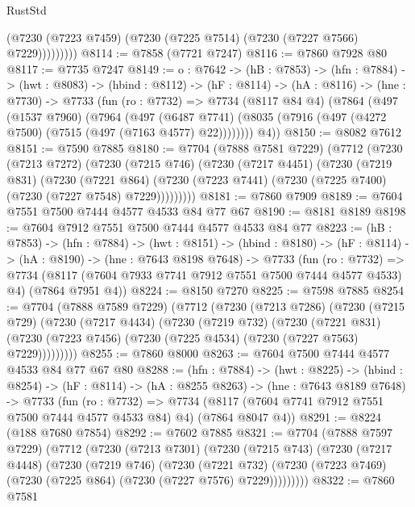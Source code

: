 \begin{lexlean}{RustStd}
\begin{coremodule}
                (@7230 (@7223 @7459) (@7230 (@7225 @7514) (@7230 (@7227 @7566) @7229)))))))))
@8114 := @7858 (@7721 @7247)
@8116 := @7860 @7928 @80
@8117 := @7735 @7247
@8149 := {o : @7642} ->
  (hB : @7853) ->
  (hfn : @7884) ->
  (hwt : @8083) ->
  (hbind : @8112) ->
  (hF : @8114) ->
  (hA : @8116) ->
  (hne : @7730) ->
  @7733
    (fun (ro : @7732) =>
    @7734
      (@8117 @84 @4)
      (@7864
        (@497
          (@1537 @7960)
          (@7964
            (@497
              (@6487 @7741)
              (@8035 (@7916 (@497 (@4272 @7500) (@7515 (@497 (@7163 @4577) @22))))))))
        @4))
@8150 := @8082 @7612
@8151 := @7590 @7885
@8180 := @7704
    (@7888 @7581 @7229)
    (@7712
      (@7230
        (@7213 @7272)
        (@7230
          (@7215 @746)
          (@7230
            (@7217 @4451)
            (@7230
              (@7219 @831)
              (@7230
                (@7221 @864)
                (@7230 (@7223 @7441) (@7230 (@7225 @7400) (@7230 (@7227 @7548) @7229)))))))))
@8181 := @7860 @7909
@8189 := @7604 @7551 @7500 @7444 @4577 @4533 @84 @77 @67
@8190 := @8181 @8189
@8198 := @7604 @7912 @7551 @7500 @7444 @4577 @4533 @84 @77
@8223 := (hB : @7853) ->
  (hfn : @7884) ->
  (hwt : @8151) ->
  (hbind : @8180) ->
  (hF : @8114) ->
  (hA : @8190) ->
  (hne : @7643 @8198 @7648) ->
  @7733
    (fun (ro : @7732) =>
    @7734 (@8117 (@7604 @7933 @7741 @7912 @7551 @7500 @7444 @4577 @4533) @4) (@7864 @7951 @4))
@8224 := @8150 @7270
@8225 := @7598 @7885
@8254 := @7704
    (@7888 @7589 @7229)
    (@7712
      (@7230
        (@7213 @7286)
        (@7230
          (@7215 @729)
          (@7230
            (@7217 @4434)
            (@7230
              (@7219 @732)
              (@7230
                (@7221 @831)
                (@7230 (@7223 @7456) (@7230 (@7225 @4534) (@7230 (@7227 @7563) @7229)))))))))
@8255 := @7860 @8000
@8263 := @7604 @7500 @7444 @4577 @4533 @84 @77 @67 @80
@8288 := (hfn : @7884) ->
  (hwt : @8225) ->
  (hbind : @8254) ->
  (hF : @8114) ->
  (hA : @8255 @8263) ->
  (hne : @7643 @8189 @7648) ->
  @7733
    (fun (ro : @7732) =>
    @7734 (@8117 (@7604 @7741 @7912 @7551 @7500 @7444 @4577 @4533 @84) @4) (@7864 @8047 @4))
@8291 := @8224 (@188 @7680 @7854)
@8292 := @7602 @7885
@8321 := @7704
    (@7888 @7597 @7229)
    (@7712
      (@7230
        (@7213 @7301)
        (@7230
          (@7215 @743)
          (@7230
            (@7217 @4448)
            (@7230
              (@7219 @746)
              (@7230
                (@7221 @732)
                (@7230 (@7223 @7469) (@7230 (@7225 @864) (@7230 (@7227 @7576) @7229)))))))))
@8322 := @7860 @7581

\end{coremodule}
\end{lexlean}

